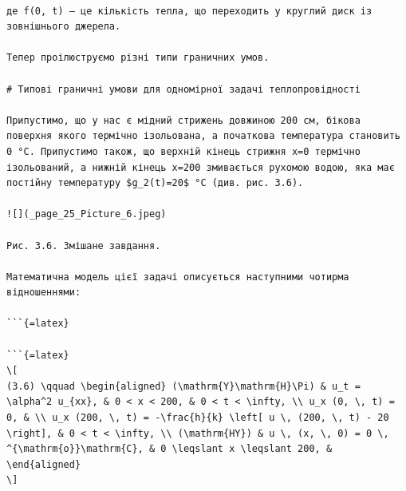 \documentclass[
]{article}
\begin{document}
\begin{verbatim}

де f(0, t) — це кількість тепла, що переходить у круглий диск із зовнішнього джерела.

Тепер проілюструємо різні типи граничних умов.

# Типові граничні умови для одномірної задачі теплопровідності

Припустимо, що у нас є мідний стрижень довжиною 200 см, бікова поверхня якого термічно ізольована, а початкова температура становить 0 °C. Припустимо також, що верхній кінець стрижня x=0 термічно ізольований, а нижній кінець x=200 змивається рухомою водою, яка має постійну температуру $g_2(t)=20$ °C (див. рис. 3.6).

![](_page_25_Picture_6.jpeg)

Рис. 3.6. Змішане завдання.

Математична модель цієї задачі описується наступними чотирма відношеннями:

```{=latex}

```{=latex}
\[
(3.6) \qquad \begin{aligned} (\mathrm{Y}\mathrm{H}\Pi) & u_t = \alpha^2 u_{xx}, & 0 < x < 200, & 0 < t < \infty, \\ u_x (0, \, t) = 0, & \\ u_x (200, \, t) = -\frac{h}{k} \left[ u \, (200, \, t) - 20 \right], & 0 < t < \infty, \\ (\mathrm{HY}) & u \, (x, \, 0) = 0 \, ^{\mathrm{o}}\mathrm{C}, & 0 \leqslant x \leqslant 200, & \end{aligned}
\]
\end{verbatim}
\end{document}
